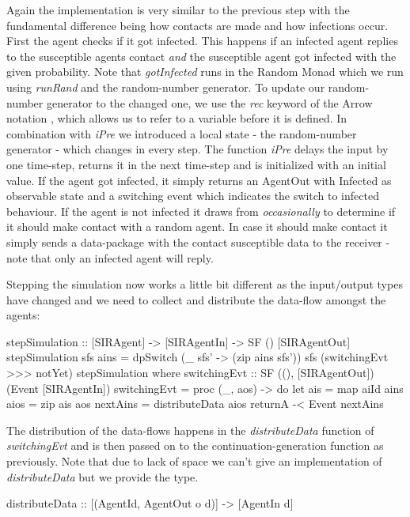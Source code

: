 Again the implementation is very similar to the previous step with the fundamental difference being how contacts are made and how infections occur. First the agent checks if it got infected. This happens if an infected agent replies to the susceptible agents contact \textit{and} the susceptible agent got infected with the given probability. Note that \textit{gotInfected} runs in the Random Monad which we run using \textit{runRand} and the random-number generator. To update our random-number generator to the changed one, we use the \textit{rec} keyword of the Arrow notation \cite{paterson_new_2001}, which allows us to refer to a variable before it is defined. In combination with \textit{iPre} we introduced a local state - the random-number generator - which changes in every step. The function \textit{iPre} delays the input by one time-step, returns it in the next time-step and is initialized with an initial value. If the agent got infected, it simply returns an AgentOut with Infected as observable state and a switching event which indicates the switch to infected behaviour.
If the agent is not infected it draws from \textit{occasionally} to determine if it should make contact with a random agent. In case it should make contact it simply sends a data-package with the contact susceptible data to the receiver - note that only an infected agent will reply.

Stepping the simulation now works a little bit different as the input/output types have changed and we need to collect and distribute the data-flow amongst the agents:

\begin{HaskellCode}
stepSimulation :: [SIRAgent] -> [SIRAgentIn] -> SF () [SIRAgentOut]
stepSimulation sfs ains =
    dpSwitch
      (\_ sfs' -> (zip ains sfs'))
      sfs
      (switchingEvt >>> notYet)
      stepSimulation
  where
    switchingEvt :: SF ((), [SIRAgentOut]) (Event [SIRAgentIn])
    switchingEvt = proc (_, aos) -> do
      let ais      = map aiId ains
          aios     = zip ais aos
          nextAins = distributeData aios
      returnA -< Event nextAins
\end{HaskellCode}

The distribution of the data-flows happens in the \textit{distributeData} function of \textit{switchingEvt} and is then passed on to the continuation-generation function as previously. Note that due to lack of space we can't give an implementation of \textit{distributeData} but we provide the type.

\begin{HaskellCode}
distributeData :: [(AgentId, AgentOut o d)] -> [AgentIn d]
\end{HaskellCode}


